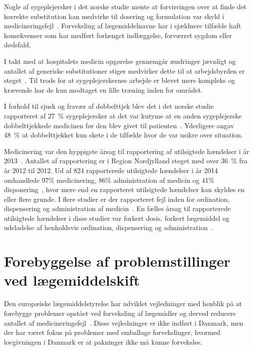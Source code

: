 Nogle af sygeplejersker i det norske studie mente at forvirringen over at finde det korrekte substitution kan medvirke til  dosering og formulation var skyld i medicineringsfejl~\citep{Hakonsen2010}. Forveksling af lægemiddelnavne har i sjældnere tilfælde haft konsekvenser som har medført forlænget indlæggelse, forværret sygdom eller dødsfald.~\citep{DanskSelskabforPatientsikkerhed2009}

I takt med at hospitalets medicin opgørelse gennemgår ændringer jævnligt og antallet af generiske  substitutioner stiger medvirker dette til at arbejdsbyrden er steget~\citep{Hakonsen2010}. Til trods for at sygeplejerskernes arbejde er blevet mere kompleks og krævende har de kun modtaget en lille træning inden for området.~\citep{Hakonsen2010}

I forhold til sjusk og fravær af dobbelttjek blev det i det norske studie rapporteret af 27~\% sygeplejersker at det var kutyme at en anden sygeplejerske dobbelttjekkede medicinen før den blev givet til patienten~\citep{Hakonsen2010}. Yderligere angav 48~\% at dobbelttjekket kun skete i de tilfælde hvor de var usikre over situation.~\citep{Hakonsen2010} 

Medicinering var den hyppigste årsag til rapportering af utilsigtede hændelser i år 2013~\citep{Patientombuddet2013}. Antallet af rapportering er i Region Nordjylland steget med over 36~\% fra år 2012 til 2012. Ud af 824 rapporterede utilsigtede hændelser i år 2014 omhandlede 97\% medicinering, 86\% administration af medicin og 41\% disponering~\citep{Jensen2014}, hvor mere end en rapporteret  utilsigtede hændelser kan skyldes en eller flere grunde. I flere studier er der rapporteret fejl inden for ordination, dispensering og administration af medicin~\citep{Barker2002,Sundhedsstyrelsen2005, Lisby2005, Tully2009}. En fælles årsag til rapporterede utilsigtede hændelser i disse studier var forkert dosis, forkert lægemiddel og udeladelse af henholdsvis ordination, dispensering og administration~\citep{Barker2002,Sundhedsstyrelsen2005,Lisby2005, Tully2009}.

\section{Forebyggelse af problemstillinger ved lægemiddelskift}
Den europæiske lægemiddelstyrelse har udviklet vejledninger med henblik på at forebygge problemer opstået ved forveksling af lægemidler og derved reducere antallet af medicineringsfejl~\citep{DanskSelskabforPatientsikkerhed2009}. Disse vejledninger er ikke indført i Danmark, men der har været fokus på problemer med emballage forvekslinger, hvormed lovgivningen i Danmark er at pakninger ikke må kunne forveksles.   

